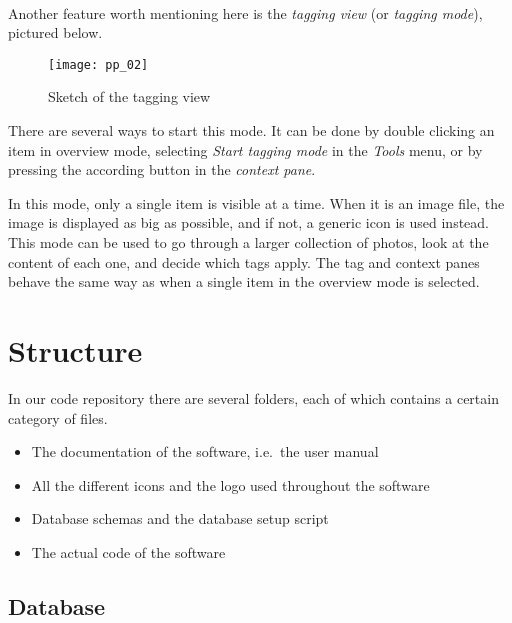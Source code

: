 \paragraph{}
Another feature worth mentioning here is the \emph{tagging view} (or
\emph{tagging mode}), pictured below. %

\begin{figure}[!h]
	\centering
	\texttt{[image: pp\_02]}
	\caption{Sketch of the tagging view}
\end{figure}

There are several ways to start this mode. It can be done by double clicking
an item in overview mode, selecting \emph{Start tagging mode} in the
\emph{Tools} menu, or by pressing the according button in the \emph{context pane}.

In this mode, only a single item is visible at a time.
When it is an image file, the image is displayed as big as
possible, and if not, a generic icon is used instead. This mode can be used to
go through a larger collection of photos, look at the content of each one, and
decide which tags apply. The tag and context panes behave the same way as
when a single item in the overview mode is selected.


\section{Structure}
\def\kapitelautor{Clemens Stadlbauer}

In our code repository there are several folders, each of which contains a
certain category of files.

\begin{itemize}
	\item[\tfpath{doc/}] The documentation of the software, i.e.~the user manual
	\item[\tfpath{icons/}] All the different icons and the logo used throughout the software
	\item[\tfpath{db/}] Database schemas and the database setup script
	\item[\tfpath{src/}] The actual code of the software
\end{itemize}

\subsection{Database}

